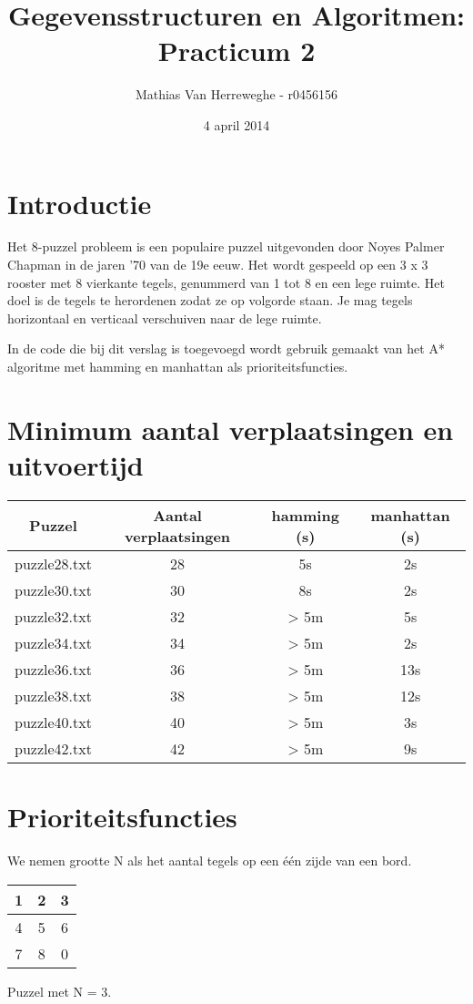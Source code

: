 \documentclass{article}
\title{Gegevensstructuren en Algoritmen: Practicum 2}
\author{Mathias Van Herreweghe - r0456156}
\date{4 april 2014}
\begin{document}
\maketitle
\newpage
\section{Introductie}

Het 8-puzzel probleem is een populaire puzzel uitgevonden door Noyes Palmer Chapman in de jaren ’70 van de 19e eeuw. Het wordt gespeeld op een 3 x 3 rooster met 8 vierkante tegels, genummerd van 1 tot 8 en een lege ruimte. Het doel is de tegels te herordenen zodat ze op volgorde staan. Je mag tegels horizontaal en verticaal verschuiven naar de lege ruimte.

In de code die bij dit verslag is toegevoegd wordt gebruik gemaakt van het A* algoritme met hamming en manhattan als prioriteitsfuncties.

\newpage
\section{Minimum aantal verplaatsingen en uitvoertijd}
\centering{}
\begin{tabular}{| c | c | c | c |}
\hline
  Puzzel & Aantal verplaatsingen & hamming (s) & manhattan (s) \\
  \hline
  puzzle28.txt & 28 & 5s & 2s\\
  \hline
  puzzle30.txt & 30 & 8s & 2s\\
  \hline
  puzzle32.txt & 32 & > 5m & 5s\\
  \hline
  puzzle34.txt & 34 & > 5m & 2s\\
  \hline
  puzzle36.txt & 36 & > 5m & 13s\\
  \hline
  puzzle38.txt & 38 & > 5m & 12s\\
  \hline
  puzzle40.txt & 40 & > 5m & 3s\\
  \hline
  puzzle42.txt & 42 & > 5m & 9s\\
  \hline
\end{tabular}

\raggedright
\section{Prioriteitsfuncties}

We nemen grootte N als het aantal tegels op een één zijde van een bord.

\begin{tabular}{| c | c | c |}
\hline
  1 & 2 & 3 \\
  \hline
  4 & 5 & 6 \\
  \hline
  7 & 8 & 0 \\
  \hline
\end{tabular}
Puzzel met N = 3.
\end{document}
